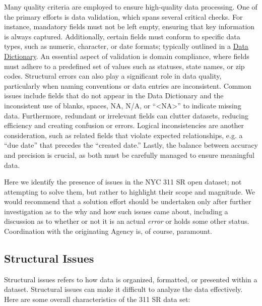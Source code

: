 \documentclass[linenumber]{jdsart}
\begin{document}
Many quality criteria are employed to ensure high\mbox{-}quality data 
processing. One of the primary efforts is data validation, which spans 
several critical checks. For instance, mandatory fields must not be 
left empty, ensuring that key information is always captured. 
Additionally, certain fields must conform to specific data types, 
such as numeric, character, or date formats; typically 
outlined in a \href{https://data.cityofnewyork.us/api/views/erm2-nwe9/files/b372b884-f86a-453b-ba16-1fe06ce9d212?download=true&filename=311_ServiceRequest_2010-Present_DataDictionary_Updated_2023.xlsx}{Data Dictionary}. An 
essential aspect of validation 
is domain compliance, where fields must adhere to a predefined set of 
values such as statuses, state names, or zip codes. Structural 
errors can also play a significant role in data quality, particularly when 
naming conventions or data entries are inconsistent. Common issues 
include fields that do not appear in the Data Dictionary 
and the inconsistent use of blanks, spaces, NA, N/A, 
or ``<NA>'' to indicate missing data. Furthermore, redundant 
or irrelevant fields can clutter datasets, reducing efficiency and 
creating confusion or errors. Logical inconsistencies are another 
consideration, such as related fields that violate expected 
relationships, e.g. a ``due date'' that precedes the ``created date.'' 
Lastly, the balance between accuracy and precision is crucial, as both 
must be carefully managed to ensure meaningful data.


Here we identify the presence of issues in the NYC 311 SR open dataset;
not attempting to solve them, but rather to highlight their scope and
magnitude. We would recommend that a solution effort 
should be undertaken only after further investigation as to 
the why and how such issues came about, including a
discussion as to whether or not it is an actual \textit{error} or 
holds some other status. Coordination with the originating Agency
is, of course, paramount.


\subsection{Structural Issues}
\label{sec:structural}
Structural issues refers to how data is organized, formatted, 
or presented within a dataset. Structural issues can make 
it difficult to analyze the data effectively. Here are some overall 
characteristics of the 311 SR data set:
\end{document}
